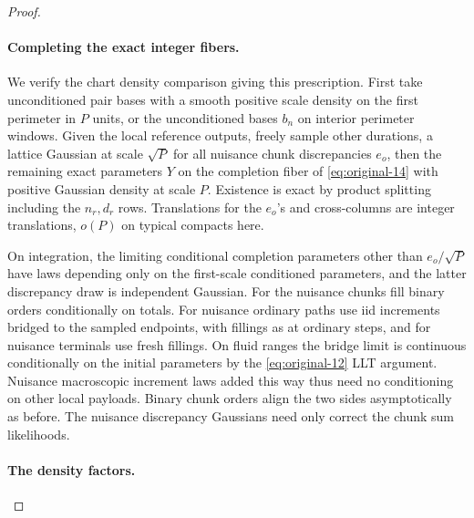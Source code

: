 \begin{proof}\leavevmode

\paragraph{Completing the exact integer fibers.}

We verify the chart density comparison giving this prescription. First take unconditioned pair bases with a
smooth positive scale density on the first perimeter in \(P\) units, or the unconditioned bases \(b_n\) on
interior perimeter windows. Given the local reference outputs, freely sample other durations, a lattice
Gaussian at scale \(\sqrt P\) for all nuisance chunk discrepancies \(e_o\), then the remaining exact
parameters \(Y\) on the completion fiber of \eqref{eq:original-14} with positive Gaussian density at scale
\(P\). Existence is exact by product splitting including the \(n_r,d_r\) rows. Translations for the
\(e_o\)'s and cross-columns are integer translations, \(o(P)\) on typical compacts here.

On integration, the
limiting conditional completion parameters other than \(e_o/\sqrt P\) have laws depending only on the
first-scale conditioned parameters, and the latter discrepancy draw is independent Gaussian. For the
nuisance chunks fill binary orders conditionally on totals. For nuisance ordinary paths use iid increments
bridged to the sampled endpoints, with fillings as at ordinary steps, and for nuisance terminals use fresh
fillings. On fluid ranges the bridge limit is continuous conditionally on the initial parameters by the
\eqref{eq:original-12} LLT argument. Nuisance macroscopic increment laws added this way thus need no
conditioning on other local payloads. Binary chunk orders align the two sides asymptotically as before. The
nuisance discrepancy Gaussians need only correct the chunk sum likelihoods.

\paragraph{The density factors.}


\end{proof}
